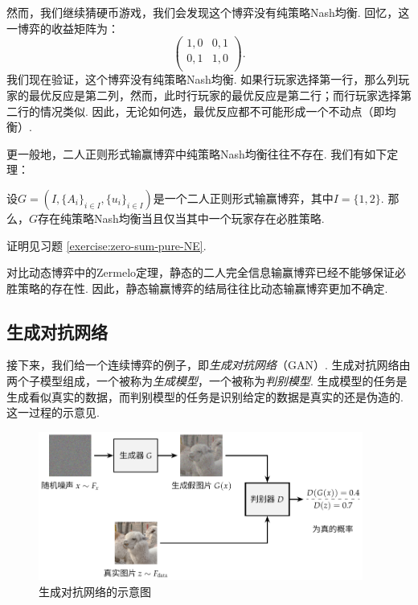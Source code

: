 然而，我们继续猜硬币游戏，我们会发现这个博弈没有纯策略Nash均衡. 回忆，这一博弈的收益矩阵为：
    \[
    \begin{pmatrix}
    1,0&0,1\\
    0,1&1,0\\
    \end{pmatrix}.
    \]
我们现在验证，这个博弈没有纯策略Nash均衡. 如果行玩家选择第一行，那么列玩家的最优反应是第二列，然而，此时行玩家的最优反应是第二行；而行玩家选择第二行的情况类似. 因此，无论如何选，最优反应都不可能形成一个不动点（即均衡）.

更一般地，二人正则形式输赢博弈中纯策略Nash均衡往往不存在. 我们有如下定理：
\begin{theorem}\label{thm:zero-sum-pure-NE}
设$G=(I,\{A_i\}_{i\in I}, \{u_i\}_{i\in I})$是一个二人正则形式输赢博弈，其中$I=\{1,2\}$. 那么，$G$存在纯策略Nash均衡当且仅当其中一个玩家存在必胜策略. %
\end{theorem}
证明见习题 \ref{exercise:zero-sum-pure-NE}.

对比动态博弈中的Zermelo定理，静态的二人完全信息输赢博弈已经不能够保证必胜策略的存在性. 因此，静态输赢博弈的结局往往比动态输赢博弈更加不确定.


\subsection{生成对抗网络}

接下来，我们给一个连续博弈的例子，即\textit{生成对抗网络}（GAN）. 生成对抗网络由两个子模型组成，一个被称为\textit{生成模型}，一个被称为\textit{判别模型}. 生成模型的任务是生成看似真实的数据，而判别模型的任务是识别给定的数据是真实的还是伪造的. 这一过程的示意见.

\begin{figure}[ht]
\centering
\includegraphics[width=0.95\textwidth]{figures/game/gan.pdf}
    \caption{生成对抗网络的示意图}
\label{fig:GAN}
\end{figure}

